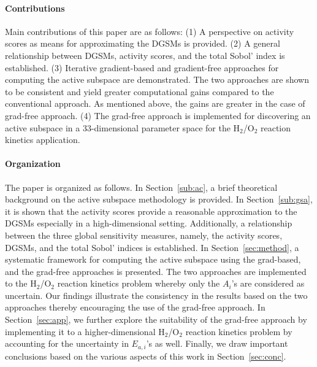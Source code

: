 \paragraph{Contributions}
Main contributions of this paper are as follows: (1) A perspective on activity scores as means for approximating
the DGSMs is provided. (2) A general relationship between DGSMs, activity scores, and the total Sobol' index 
is established. (3) Iterative gradient-based and gradient-free approaches for computing the active subspace are
 demonstrated. The two approaches are shown to be consistent and yield greater
computational gains compared to the 
 conventional approach. As mentioned above, the gains are greater in the case of grad-free approach. (4) The
 grad-free approach is implemented for discovering an active subspace in a 33-dimensional parameter space 
 for the H$_2$/O$_2$ reaction kinetics application. 
 
 \paragraph{Organization}
 The paper is organized as follows. In Section~\ref{sub:ac}, a brief theoretical background on
 the active subspace methodology is provided. In Section~\ref{sub:gsa}, it is shown that the activity
 scores provide a reasonable approximation to the DGSMs especially in a high-dimensional setting. 
 Additionally, a relationship between the three global sensitivity measures, namely, the activity scores,
 DGSMs, and the total Sobol' indices is established. In Section~\ref{sec:method}, a systematic framework
 for computing the active subspace using the grad-based, and the grad-free approaches is presented. 
The two approaches are implemented to the H$_2$/O$_2$ reaction kinetics problem whereby only
the $A_i$'s are considered as uncertain. Our findings illustrate the consistency in the results based on
the two approaches thereby encouraging the use of the grad-free approach. In Section~\ref{sec:app},
we further explore the suitability of the grad-free approach by implementing it to a higher-dimensional
H$_2$/O$_2$ reaction kinetics problem by accounting for the uncertainty in $E_{a,i}$'s as well. 
Finally, we draw important conclusions based on the various aspects of this work in Section~\ref{sec:conc}.










 




